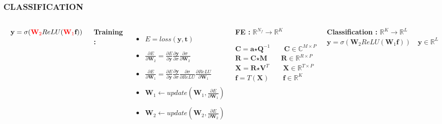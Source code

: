 \documentclass{beamer}
\begin{document}
\begin{frame}
\frametitle{CLASSIFICATION}
\begin{columns}[c]
$\quad \textbf{y} = \sigma({\color{red}\textbf{W}_{2}}ReLU({\color{red}\textbf{W}_{1}}\textbf{f}))$
\bigskip

\noindent \textbf{Training :}
\begin{itemize}
\item $E = loss(\textbf{y}, \textbf{t})$
\item $\frac{\partial E}{\partial \textbf{W}_{2}} = \frac{\partial E}{\partial \textbf{y}}\frac{\partial \textbf{y}}{\partial \sigma}\frac{\partial \sigma}{\partial \textbf{W}_{2}}$
\item $\frac{\partial E}{\partial \textbf{W}_{1}} = \frac{\partial E}{\partial \textbf{y}}\frac{\partial \textbf{y}}{\partial \sigma}\frac{\partial \sigma}{\partial ReLU}\frac{\partial ReLU}{\partial \textbf{W}_{1}}$
\item $\textbf{W}_{1} \leftarrow update(\textbf{W}_{1}, \frac{\partial E}{\partial \textbf{W}_{1}})$
\item $\textbf{W}_{2} \leftarrow update(\textbf{W}_{2}, \frac{\partial E}{\partial \textbf{W}_{2}})$
\end{itemize}

\begin{block}{\textbf{FE :} $\mathbb{R}^{N_{f}} \rightarrow \mathbb{R}^{K}$}

$\textbf{C} = \textbf{a} \bm{\star} \textbf{Q}^{-1} \qquad \textbf{C} \in \mathbb{C}^{M \times P}$\\
$\textbf{R} = \textbf{C} \bm{\star} \textbf{M} \qquad \textbf{R} \in \mathbb{R}^{R \times P}$\\
$\textbf{X} = \textbf{R} \bm{\star} \textbf{V}^{T} \qquad \textbf{X} \in \mathbb{R}^{T \times P}$\\
$\textbf{f} = T(\textbf{X}) \qquad \textbf{f} \in \mathbb{R}^{K}$\\
\end{block}
\begin{block}{\textbf{Classification :} $\mathbb{R}^{K} \rightarrow \mathbb{R}^{L}$}
$\textbf{y} = \sigma(\textbf{W}_{2}ReLU(\textbf{W}_{1}\textbf{f})) \quad \textbf{y} \in \mathbb{R}^{L}$
\end{block}
\end{columns}
\end{frame}
\end{document}
